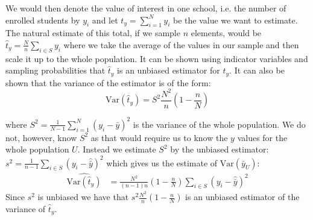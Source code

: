 \documentclass{article}
\begin{document}
We would then denote the value of interest in one school, i.e. the number of
enrolled students by \(y_i\) and let
\(
  t_y = \sum_{i = 1}^{N} y_i
\)
be the value we want to estimate.
The natural estimate of this total, if we sample \(n\) elements, would be
\(
\hat{t}_y = \frac{N}{n}\sum_{i \in S} y_i
\)
where we take the average of the values in our sample and then scale it up to
the whole population.
It can be shown using indicator variables and sampling probabilities that
\(\hat{t}_y\) is an unbiased estimator for \(t_y\).
%
%
It can also be shown that the variance of the estimator is of the form:
\begin{equation*}
\mathrm{Var} \left( \hat{t}_y \right) = S^2\frac{N^2}{n} \left( 1 - \frac{n}{N}
\right)
\end{equation*}

where
\(
S^2 = \frac{1}{N - 1} \sum_{i = 1}^N (y_i - \bar{y})^2
\)
is the variance of the whole population.
We do not, however, know \(S^2\) as that would require us to know the \(y\) values
for the whole population \(U\). Instead we estimate \(S^2\) by the unbiased estimator:
\(
  s^2 = \frac{1}{n - 1} \sum_{i \in S} \left( y_i - \hat{\bar{y}} \right)^2
\)
which gives us the estimate of \(\mathrm{Var}(\bar{y}_U)\):
\begin{align*}
  \widehat{\mathrm{Var}(\hat{t}_y)}
  &=\frac{N^2}{\left( n - 1 \right)n} \left( 1 - \frac{n}{N} \right) \sum_{i \in S} \left( y_i - \hat{\bar{y}} \right)^2
\end{align*}
Since \(s^2\) is unbiased we have that \(s^2\frac{N^2}{n} \left( 1 - \frac{n}{N}
\right)\) is an unbiased estimator of the variance of \(\hat{t}_y\).
\end{document}
